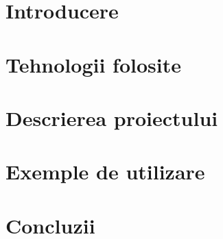 \documentclass[12pt,a4paper]{article}
\begin{document}
\onehalfspacing



\newpage{} \tableofcontents{}

\newpage{}
\section{Introducere}

\newpage{}\section{Tehnologii folosite}

\newpage{}\section{Descrierea proiectului}

\newpage{}\section{Exemple de utilizare}

\newpage{}\section{Concluzii}

\end{document}
